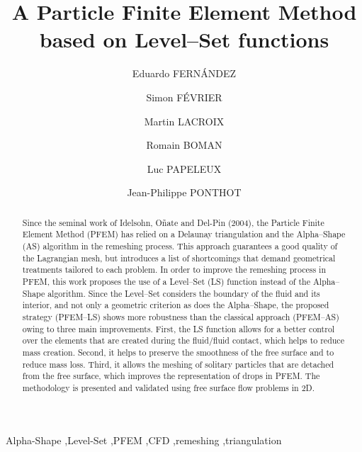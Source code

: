 \documentclass[final,3p,times]{elsarticle}
\begin{document}
\begin{frontmatter}

\title{A Particle Finite Element Method based on Level--Set functions}

\author[a1]{Eduardo FERNÁNDEZ}
\author[a1]{Simon FÉVRIER}
\author[a1]{Martin LACROIX}
\author[a1]{Romain BOMAN}
\author[a1]{Luc PAPELEUX}
\author[a1]{Jean-Philippe PONTHOT}

\address[a1]{Aerospace and Mechanical Engineering Department, University of Liège, Belgium}

\begin{abstract}
Since the seminal work of Idelsohn, Oñate and Del-Pin (2004), the Particle Finite Element Method (PFEM) has relied on a Delaunay triangulation and the Alpha--Shape (AS) algorithm in the remeshing process. This approach guarantees a good quality of the Lagrangian mesh, but introduces a list of shortcomings that demand geometrical treatments tailored to each problem. In order to improve the remeshing process in PFEM, this work proposes the use of a Level--Set (LS) function instead of the Alpha--Shape algorithm. Since the Level--Set considers the boundary of the fluid and its interior, and not only a geometric criterion as does the Alpha--Shape, the proposed strategy (PFEM--LS) shows more robustness than the classical approach (PFEM--AS) owing to three main improvements. First, the LS function allows for a better control over the elements that are created during the fluid/fluid contact, which helps to reduce mass creation. Second, it helps to preserve the smoothness of the free surface and to reduce mass loss. Third, it allows the meshing of solitary particles that are detached from the free surface, which improves the representation of drops in PFEM. The methodology is presented and validated using free surface flow problems in 2D.
\end{abstract}


\begin{keyword}
Alpha-Shape \sep Level-Set \sep PFEM \sep CFD \sep remeshing \sep triangulation



\end{keyword}

\end{frontmatter}
\end{document}
